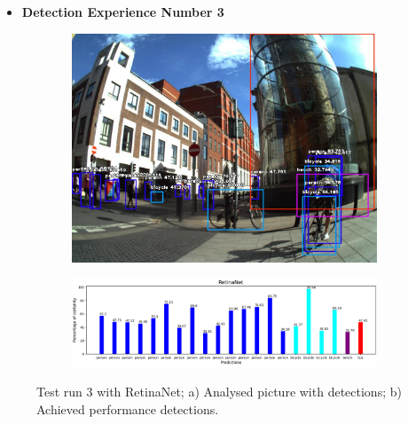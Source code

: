       \newpage

      \begin{itemize}
        \item \textbf{Detection Experience Number 3}
      \end{itemize}
    

      \begin{figure}[H]
        \centering
        \captionsetup{justification=centering}

        \begin{subfigure}{0.29\textwidth}
        \includegraphics[width=\textwidth]{Sections/4InitialWork/4_images_obj_run4/retinaNet.jpg} 
        \caption{}
        \end{subfigure}
        \begin{subfigure}{0.7\textwidth}
        \includegraphics[width=\textwidth]{Sections/4InitialWork/4_images_obj_run4/retinaNet_graph.png}
        \caption{}
        \end{subfigure}
        
        \caption[Test run 3 with RetinaNet]{ 
        Test run 3 with RetinaNet; a) Analysed picture with detections; b) Achieved performance detections. }
        \end{figure}



